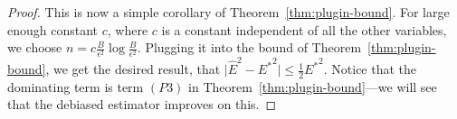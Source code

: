 \finalPlugin*

\begin{proof}
This is now a simple corollary of Theorem~\ref{thm:plugin-bound}. For large enough constant $c$, where $c$ is a constant independent of all the other variables, we choose $n = c\frac{B}{\epsilon^2} \log{\frac{B}{\epsilon^2}}$. Plugging it into the bound of Theorem~\ref{thm:plugin-bound}, we get the desired result, that $\lvert \hat{E}^2 - {E^*}^2 \rvert \leq \frac{1}{2}{E^*}^2$. Notice that the dominating term is term $(P3)$ in Theorem~\ref{thm:plugin-bound}---we will see that the debiased estimator improves on this. 







\end{proof}
